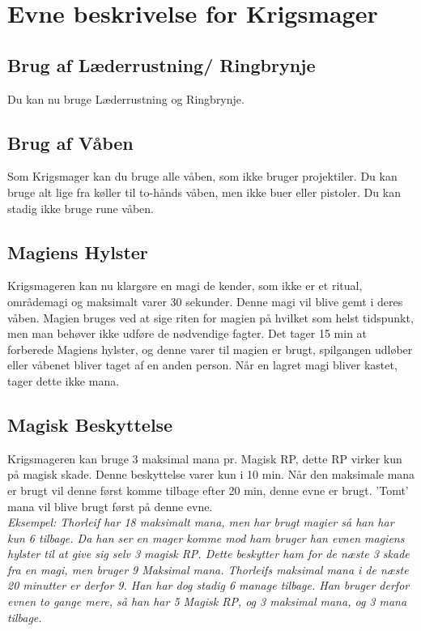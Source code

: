 \section*{Evne beskrivelse for Krigsmager}

\subsection*{Brug af Læderrustning/ Ringbrynje}
Du kan nu bruge Læderrustning og Ringbrynje.

\subsection*{Brug af Våben}
Som Krigsmager kan du bruge alle våben, som ikke bruger projektiler. Du kan bruge alt lige fra køller til to-hånds våben, men ikke buer eller pistoler. Du kan stadig ikke bruge rune våben.





\subsection*{Magiens Hylster}
Krigsmageren kan nu klargøre en magi de kender, som ikke er et ritual, områdemagi og maksimalt varer 30 sekunder. Denne magi vil blive gemt i deres våben. Magien bruges ved at sige riten for magien på hvilket som helst tidspunkt, men man behøver ikke udføre de nødvendige fagter. Det tager 15 min at forberede Magiens hylster, og denne varer til magien er brugt, spilgangen udløber eller våbenet bliver taget af en anden person. Når en lagret magi bliver kastet, tager dette ikke mana.


\subsection*{Magisk Beskyttelse}
Krigsmageren kan bruge 3 maksimal mana pr. Magisk RP, dette RP virker kun på magisk skade. Denne beskyttelse varer kun i 10 min. Når den maksimale mana er brugt vil denne først komme tilbage efter 20 min, denne evne er brugt. 'Tomt' mana vil blive brugt først på denne evne.\\
\textit{Eksempel: Thorleif har 18 maksimalt mana, men har brugt magier så han har kun 6 tilbage. Da han ser en mager komme mod ham bruger han evnen magiens hylster til at give sig selv 3 magisk RP. Dette beskytter ham for de næste 3 skade fra en magi, men bruger 9 Maksimal mana. Thorleifs maksimal mana i de næste 20 minutter er derfor 9. Han har dog stadig 6 manage tilbage. Han bruger derfor evnen to gange mere, så han har 5 Magisk RP, og 3 maksimal mana, og 3 mana tilbage.}
